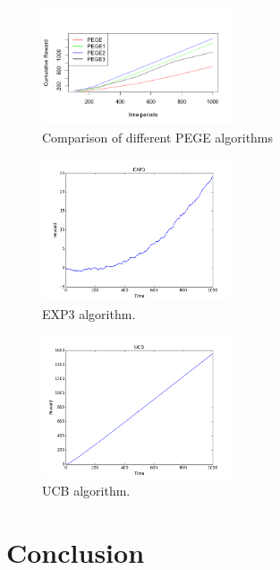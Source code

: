\documentclass{article}
\theoremstyle{plain}
\theoremstyle{definition}
\begin{document}
\begin{figure}[htb]
{
\centering
\includegraphics[width=0.50\textwidth,]{algo_compare}
\caption{Comparison of different PEGE algorithms \label{fig: tah0}}
}
\end{figure}




\begin{figure}[htb]
{
\centering
\includegraphics[width=0.50\textwidth]{plot11}
\caption{EXP3 algorithm. \label{fig: tahi}}
}
\end{figure}

\begin{figure}[htb]
{
\centering
\includegraphics[width=0.50\textwidth]{UCB1}
\caption{UCB algorithm. \label{fig: tah2}}
}
\end{figure}






\section{Conclusion}
\end{document}
